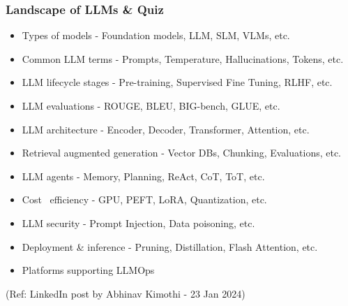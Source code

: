 \begin{frame}[fragile]\frametitle{Landscape of LLMs \& Quiz}

\begin{itemize}
\item Types of models - Foundation models, LLM, SLM, VLMs, etc.
\item Common LLM terms - Prompts, Temperature, Hallucinations, Tokens, etc.
\item LLM lifecycle stages - Pre-training, Supervised Fine Tuning, RLHF, etc.
\item LLM evaluations - ROUGE, BLEU, BIG-bench, GLUE, etc.
\item LLM architecture - Encoder, Decoder, Transformer, Attention, etc.
\item Retrieval augmented generation - Vector DBs, Chunking, Evaluations, etc.
\item LLM agents - Memory, Planning, ReAct, CoT, ToT, etc.
\item Cost \ efficiency - GPU, PEFT, LoRA, Quantization, etc.
\item LLM security - Prompt Injection, Data poisoning, etc.
\item Deployment \& inference - Pruning, Distillation, Flash Attention, etc.
\item Platforms supporting LLMOps
\end{itemize}	 

{\tiny (Ref: LinkedIn post by Abhinav Kimothi - 23 Jan 2024)}
\end{frame}




